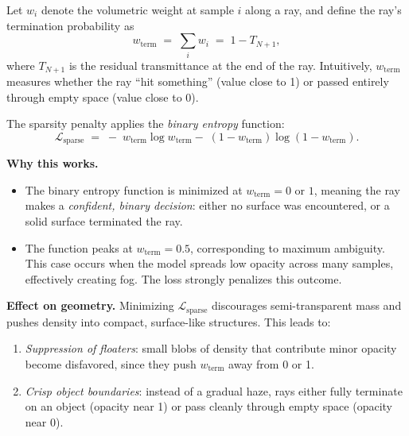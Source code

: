 \begin{enrichment}
\begin{enrichment}
        Let $w_i$ denote the volumetric weight at sample $i$ along a ray, and define the ray’s termination probability as
        \[
        w_{\mathrm{term}} \;=\; \sum_i w_i \;=\; 1 - T_{N+1},
        \]
        where $T_{N+1}$ is the residual transmittance at the end of the ray. Intuitively, $w_{\mathrm{term}}$ measures whether the ray ``hit something'' (value close to 1) or passed entirely through empty space (value close to 0).
        
        The sparsity penalty applies the \emph{binary entropy} function:
        \begin{equation}
            \mathcal{L}_{\mathrm{sparse}}
            \;=\;
            -\;w_{\mathrm{term}}\log w_{\mathrm{term}}
            -\;(1-w_{\mathrm{term}})\log(1-w_{\mathrm{term}}).
            \label{eq:chapter23_latentnerf_sparse}
        \end{equation}
        
        \newpage
        
        \textbf{Why this works.}
        \begin{itemize}
            \item The binary entropy function is minimized at $w_{\mathrm{term}}=0$ or $1$, meaning the ray makes a \emph{confident, binary decision}: either no surface was encountered, or a solid surface terminated the ray.
            \item The function peaks at $w_{\mathrm{term}}=0.5$, corresponding to maximum ambiguity. This case occurs when the model spreads low opacity across many samples, effectively creating fog. The loss strongly penalizes this outcome.
        \end{itemize}
        
        \textbf{Effect on geometry.}
        Minimizing $\mathcal{L}_{\mathrm{sparse}}$ discourages semi-transparent mass and pushes density into compact, surface-like structures. This leads to:
        \begin{enumerate}
            \item \emph{Suppression of floaters}: small blobs of density that contribute minor opacity become disfavored, since they push $w_{\mathrm{term}}$ away from 0 or 1.
            \item \emph{Crisp object boundaries}: instead of a gradual haze, rays either fully terminate on an object (opacity near 1) or pass cleanly through empty space (opacity near 0).
        \end{enumerate}
        

\end{enrichment}
\end{enrichment}
